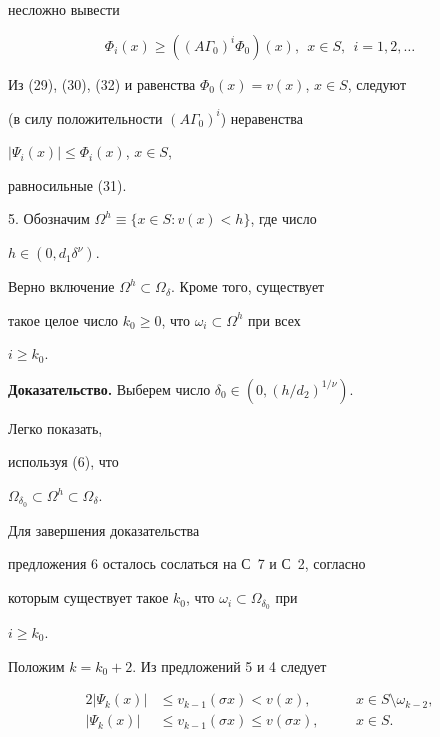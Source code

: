 несложно вывести 


\begin{equation} 


\Phi_i(x)\ge((A\Gamma_0)^i\Phi_0)(x),\ \ x\in S, 


\ \ i=1,2,\dotsc 


\end{equation} 


Из (29), (30), (32) и равенства $\Phi_0(x)=v(x)$, $x\in S$, следуют 


(в силу положительности $(A\Gamma_0)^i$) неравенства 


$|\Psi_i(x)|\le\Phi_i(x)$, $x\in S$, 


равносильные (31). 


\medskip 


 


5. Обозначим $\Omega^h\equiv\{x\in S:v(x)<h\}$, где число 


$h\in(0,d_1\delta^\nu)$. 


 


\begin{prop} 


Верно включение $\Omega^h\subset\Omega_\delta$. Кроме того, существует 


такое целое число $k_0\ge0$, что $\omega_i\subset\Omega^h$ при всех 


$i\ge k_0$. 


\end{prop} 


 


{\bf Доказательство.} Выберем число $\delta_0\in(0,(h/d_2)^{1/\nu})$. 


Легко показать, 


используя (6), что 


$\Omega_{\delta_0}\subset\Omega^h\subset\Omega_\delta$. 


Для завершения доказательства 


предложения 6 осталось сослаться на С~7 и С~2, согласно 


которым существует такое $k_0$, что $\omega_i\subset\Omega_{\delta_0}$ при 


$i\ge k_0$. 


 


Положим $k=k_0+2$. Из предложений 5 и 4 следует 


\begin{alignat}{2} 


|\Psi_k(x)|&\le v_{k-1}(\sigma x)<v(x), &\quad 


& x\in S\setminus\omega_{k-2},\\ 


|\Psi_k(x)|&\le v_{k-1}(\sigma x)\le v(\sigma x), 


&\quad &x\in S. 


\end{alignat} 


